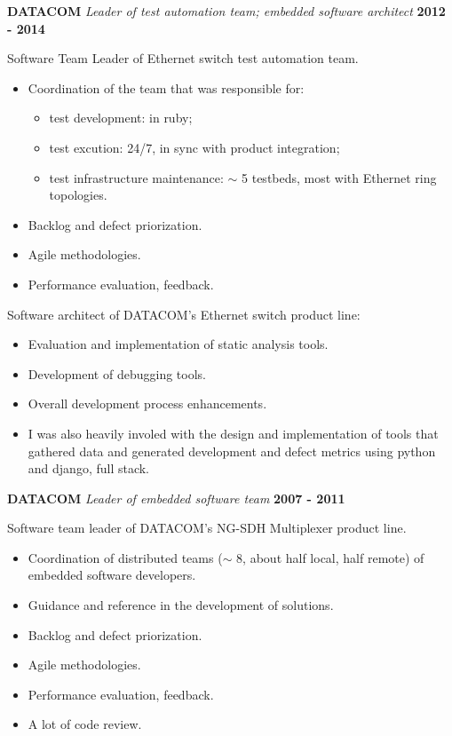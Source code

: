 \documentclass[margin,line]{resume}
\providecommand{\tightlist}{\setlength{\itemsep}{0pt}\setlength{\parskip}{0pt}}
\begin{document}
\begin{resume}
    

    

    \textbf{DATACOM} \nl{}
    \textsl{Leader of test automation team; embedded software architect} \hfill \textbf{2012 - 2014}

    Software Team Leader of Ethernet switch test automation team.
\begin{itemize}
\tightlist
\item
  Coordination of the team that was responsible for:
\begin{itemize}
  \tightlist
  \item
    test development: in ruby;
  \item
    test excution: 24/7, in sync with product integration;
  \item
    test infrastructure maintenance: \(\sim\) 5 testbeds, most with
    Ethernet ring topologies.
  \end{itemize}
\item
  Backlog and defect priorization.
\item
  Agile methodologies.
\item
  Performance evaluation, feedback.
\end{itemize}

Software architect of DATACOM's Ethernet switch product line:
\begin{itemize}
\tightlist
\item
  Evaluation and implementation of static analysis tools.
\item
  Development of debugging tools.
\item
  Overall development process enhancements.
\item
  I was also heavily involed with the design and implementation of tools
  that gathered data and generated development and defect metrics using
  python and django, full stack.
\end{itemize}


    

    

    \textbf{DATACOM} \nl{}
    \textsl{Leader of embedded software team} \hfill \textbf{2007 - 2011}

    Software team leader of DATACOM's NG-SDH Multiplexer product line.
\begin{itemize}
\tightlist
\item
  Coordination of distributed teams (\(\sim\) 8, about half local, half
  remote) of embedded software developers.
\item
  Guidance and reference in the development of solutions.
\item
  Backlog and defect priorization.
\item
  Agile methodologies.
\item
  Performance evaluation, feedback.
\item
  A lot of code review.
\end{itemize}



\end{resume}
\end{document}
